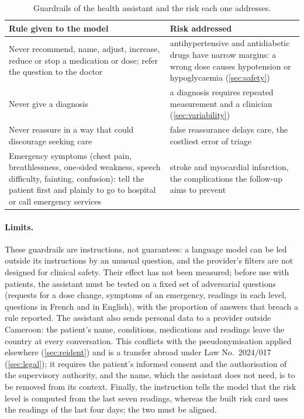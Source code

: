 \begin{table}[htbp]
\centering\footnotesize
\caption{Guardrails of the health assistant and the risk each one addresses.}\label{tab:assistant-guardrails}
\begin{tabularx}{\textwidth}{@{}>{\raggedright\arraybackslash}p{5.2cm} X@{}}
\toprule
\textbf{Rule given to the model} & \textbf{Risk addressed} \\
\midrule
Never recommend, name, adjust, increase, reduce or stop a medication or dose; refer the question to the doctor & antihypertensive and antidiabetic drugs have narrow margins: a wrong dose causes hypotension or hypoglycaemia (\cref{sec:safety}) \\
Never give a diagnosis & a diagnosis requires repeated measurement and a clinician (\cref{sec:variability}) \\
Never reassure in a way that could discourage seeking care & false reassurance delays care, the costliest error of triage \\
Emergency symptoms (chest pain, breathlessness, one-sided weakness, speech difficulty, fainting, confusion): tell the patient first and plainly to go to hospital or call emergency services & stroke and myocardial infarction, the complications the follow-up aims to prevent \\
\bottomrule
\end{tabularx}
\end{table}

\paragraph{Limits.} These guardrails are instructions, not guarantees: a language model can be led outside its instructions by an unusual question, and the provider's filters are not designed for clinical safety. Their effect has not been measured; before use with patients, the assistant must be tested on a fixed set of adversarial questions (requests for a dose change, symptoms of an emergency, readings in each level, questions in French and in English), with the proportion of answers that breach a rule reported. The assistant also sends personal data to a provider outside Cameroon: the patient's name, conditions, medications and readings leave the country at every conversation. This conflicts with the pseudonymisation applied elsewhere (\cref{sec:reident}) and is a transfer abroad under Law No.~2024/017 (\cref{sec:legal}); it requires the patient's informed consent and the authorisation of the supervisory authority, and the name, which the assistant does not need, is to be removed from its context. Finally, the instruction tells the model that the risk level is computed from the last seven readings, whereas the built risk card uses the readings of the last four days; the two must be aligned.

